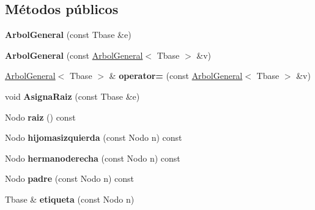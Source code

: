 \subsection*{Métodos públicos}
\begin{DoxyCompactItemize}
\item 
{\bfseries Arbol\+General} (const Tbase \&e)\hypertarget{class_arbol_general_a8ddac1a024f05bee96f4c259fad76c4c}{}\label{class_arbol_general_a8ddac1a024f05bee96f4c259fad76c4c}

\item 
{\bfseries Arbol\+General} (const \hyperlink{class_arbol_general}{Arbol\+General}$<$ Tbase $>$ \&v)\hypertarget{class_arbol_general_ad7926f03eb051b9691d57f4e508cad4d}{}\label{class_arbol_general_ad7926f03eb051b9691d57f4e508cad4d}

\item 
\hyperlink{class_arbol_general}{Arbol\+General}$<$ Tbase $>$ \& {\bfseries operator=} (const \hyperlink{class_arbol_general}{Arbol\+General}$<$ Tbase $>$ \&v)\hypertarget{class_arbol_general_aebd3723e9929b905445127a754a26759}{}\label{class_arbol_general_aebd3723e9929b905445127a754a26759}

\item 
void {\bfseries Asigna\+Raiz} (const Tbase \&e)\hypertarget{class_arbol_general_a84781986cd57390540600494303b0e9d}{}\label{class_arbol_general_a84781986cd57390540600494303b0e9d}

\item 
Nodo {\bfseries raiz} () const \hypertarget{class_arbol_general_a385099b0c15ac15cf15a954725e1e8a2}{}\label{class_arbol_general_a385099b0c15ac15cf15a954725e1e8a2}

\item 
Nodo {\bfseries hijomasizquierda} (const Nodo n) const \hypertarget{class_arbol_general_aebf8b37c050c73a9bff1f697efd931b5}{}\label{class_arbol_general_aebf8b37c050c73a9bff1f697efd931b5}

\item 
Nodo {\bfseries hermanoderecha} (const Nodo n) const \hypertarget{class_arbol_general_a854ad15f86991fdc0e2257b3d32a98b8}{}\label{class_arbol_general_a854ad15f86991fdc0e2257b3d32a98b8}

\item 
Nodo {\bfseries padre} (const Nodo n) const \hypertarget{class_arbol_general_a9027dd4b060e1216241d4cfe9f2898e7}{}\label{class_arbol_general_a9027dd4b060e1216241d4cfe9f2898e7}

\item 
Tbase \& {\bfseries etiqueta} (const Nodo n)\hypertarget{class_arbol_general_ac08063e5bcc034ab723d21c0fea44b46}{}\label{class_arbol_general_ac08063e5bcc034ab723d21c0fea44b46}


\end{DoxyCompactItemize}
